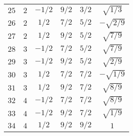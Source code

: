 \begin{table}
\begin{center}
\begin{tabular}{|c|c|c|c|c|c|}
$25$ & $2$ & $-1/2$ & $9/2$ & $3/2$ & $\sqrt{1/3}$ \\ 
$26$ & $2$ & $1/2$ & $7/2$ & $5/2$ & $-\sqrt{2/9}$ \\ 
$27$ & $2$ & $1/2$ & $9/2$ & $5/2$ & $\sqrt{7/9}$ \\ 
$28$ & $3$ & $-1/2$ & $7/2$ & $5/2$ & $\sqrt{7/9}$ \\ 
$29$ & $3$ & $-1/2$ & $9/2$ & $5/2$ & $\sqrt{2/9}$ \\ 
$30$ & $3$ & $1/2$ & $7/2$ & $7/2$ & $-\sqrt{1/9}$ \\ 
$31$ & $3$ & $1/2$ & $9/2$ & $7/2$ & $\sqrt{8/9}$ \\ 
$32$ & $4$ & $-1/2$ & $7/2$ & $7/2$ & $\sqrt{8/9}$ \\ 
$33$ & $4$ & $-1/2$ & $9/2$ & $7/2$ & $\sqrt{1/9}$ \\ 
$34$ & $4$ & $1/2$ & $9/2$ & $9/2$ & $1$ \\ 
\hline 
\end{tabular}
\end{center}
\end{table}


